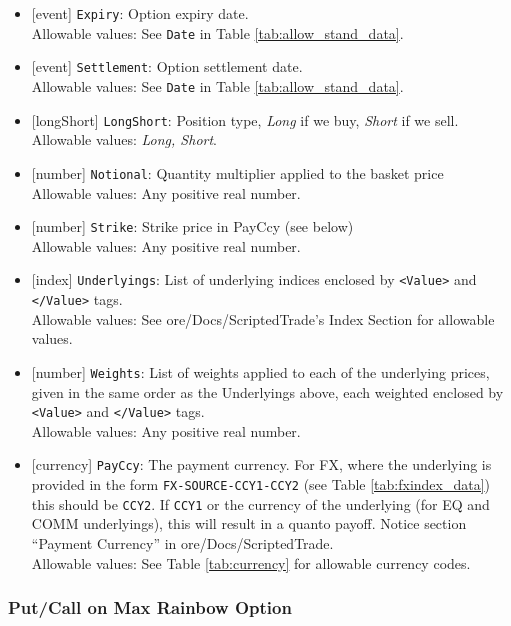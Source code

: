 \begin{itemize}
    \item{}[event] \lstinline!Expiry!: Option expiry date. \\
    Allowable values: See \lstinline!Date! in Table \ref{tab:allow_stand_data}.
    \item{}[event] \lstinline!Settlement!: Option settlement date. \\
    Allowable values: See \lstinline!Date! in Table \ref{tab:allow_stand_data}.
    \item{}[longShort] \lstinline!LongShort!: Position type,
          {\em Long} if we buy, {\em Short} if we sell.\\
    Allowable values: \emph{Long, Short}.
        \item{}[number] \lstinline!Notional!: Quantity multiplier applied to the
          basket price \\
          Allowable values: Any positive real number.
        \item{}[number] \lstinline!Strike!: Strike price in PayCcy (see
          below) \\
          Allowable values: Any positive real number.
    \item{}[index] \lstinline!Underlyings!: List of underlying indices
          enclosed by {\tt <Value>} and {\tt </Value>} tags. \\
          Allowable values: See ore/Docs/ScriptedTrade's Index Section for allowable values.
    \item{}[number] \lstinline!Weights!: List of weights applied to each of
          the underlying prices, given in the same order as
          the Underlyings above, each weighted enclosed by {\tt <Value>} and {\tt </Value>} tags.\\
          Allowable values: Any positive real number.
    \item{}[currency] \lstinline!PayCcy!: The payment currency. For FX, where the underlying is provided
      in the form \lstinline!FX-SOURCE-CCY1-CCY2! (see Table \ref{tab:fxindex_data}) this should
      be \lstinline!CCY2!. If \lstinline!CCY1! or the currency of the underlying (for EQ and
      COMM underlyings), this will result in a quanto payoff. Notice section ``Payment Currency'' in ore/Docs/ScriptedTrade. \\
        Allowable values: See Table \ref{tab:currency} for allowable currency codes.
\end{itemize}

\subsubsection*{Put/Call on Max Rainbow Option}

